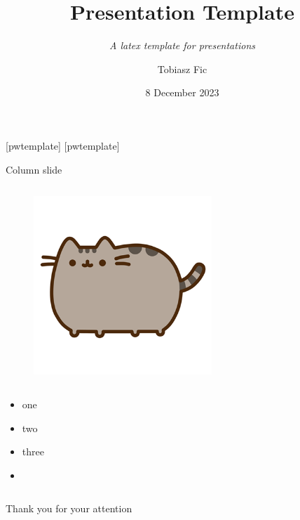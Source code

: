 

\title{Presentation Template}
    \subtitle{\textit{A latex template for presentations}}
\author[T. Fic]{Tobiasz Fic}

\date{8 December 2023}



\begin{frame}
    \maketitle
\end{frame}

[pwtemplate]
[pwtemplate]

\begin{columnframe}{Column slide}
    \begin{column}{0.5\textwidth}
        \begin{figure}
            \centering
            \includegraphics[width=0.6\textwidth, frame]{images/pusheen.png}
        \end{figure}
    \end{column}
    \begin{column}{0.5\textwidth}
        \begin{itemize}
            \item one \keV
            \item two \MeV
            \item three \GeV
            \item \aegis
        \end{itemize}
    \end{column}
\end{columnframe}

\begin{frame}{}
    \centering
    \Large{Thank you for your attention}
\end{frame}

